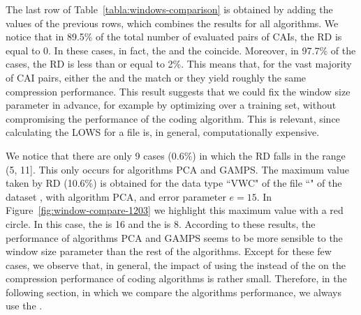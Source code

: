 The last row of Table~\ref{tabla:windows-comparison} is obtained by adding the values of the previous rows, which combines the results for all algorithms. We notice that in 89.5\% of the total number of evaluated pairs of CAIs, the RD is equal to 0. In these cases, in fact, the \ows and the \lows coincide. Moreover, in 97.7\% of the cases, the RD is less than or equal to 2\%. This means that, for the vast majority of CAI pairs, either the \ows and the \lows match or they yield roughly the same compression performance. This result suggests that we could fix the window size parameter in advance, for example by optimizing over a training set, without compromising the performance of the coding algorithm. This is relevant, since calculating the LOWS for a file is, in general, computationally expensive.


We notice that there are only 9 cases (0.6\%) in which the RD falls in the range (5, 11]. This only occurs for algorithms PCA and GAMPS. The maximum value taken by RD (10.6\%) is obtained for the data type ``VWC" of the file ``\fileIrkisTwo" of the dataset \datasetsst, with algorithm PCA, and error parameter $e=15$. In Figure~\ref{fig:window-compare-1203} we highlight this maximum value with a red circle. In this case, the \ows is 16 and the \lows is 8. According to these results, the performance of algorithms PCA and GAMPS seems to be more sensible to the window size parameter than the rest of the algorithms. Except for these few cases, we observe that, in general, the impact of using the \ows instead of the \lows on the compression performance of coding algorithms is rather small. Therefore, in the following section, in which we compare the algorithms performance, we always use the \owsns.


\clearpage

